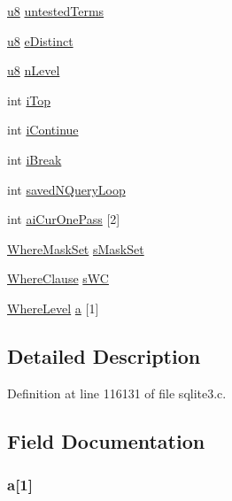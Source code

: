 \begin{DoxyCompactItemize}
\item 
\hyperlink{sqlite3_8c_a74a0f6424ae628af25f23f0a35f6ead3}{u8} \hyperlink{struct_where_info_a0a31d549c31640dcaeb02d9acb20d720}{untested\+Terms}
\item 
\hyperlink{sqlite3_8c_a74a0f6424ae628af25f23f0a35f6ead3}{u8} \hyperlink{struct_where_info_afe5ecc400155291a3822ea56569b83e3}{e\+Distinct}
\item 
\hyperlink{sqlite3_8c_a74a0f6424ae628af25f23f0a35f6ead3}{u8} \hyperlink{struct_where_info_af57795809290e8e1bcebffb5a5cd0787}{n\+Level}
\item 
int \hyperlink{struct_where_info_afd3ca9af6c497b1ae41a842e149cba2a}{i\+Top}
\item 
int \hyperlink{struct_where_info_ae3bb72cb12d44e96b691c6c71dbf1267}{i\+Continue}
\item 
int \hyperlink{struct_where_info_a7f3109c33d52f125acf777d385290bc2}{i\+Break}
\item 
int \hyperlink{struct_where_info_af689a27f89f0be772017cb104cde4636}{saved\+N\+Query\+Loop}
\item 
int \hyperlink{struct_where_info_af78e25c217cb5a4e878c8abcf26cbf74}{ai\+Cur\+One\+Pass} \mbox{[}2\mbox{]}
\item 
\hyperlink{struct_where_mask_set}{Where\+Mask\+Set} \hyperlink{struct_where_info_aec482a9955c074b06f8e4281b8d81ebf}{s\+Mask\+Set}
\item 
\hyperlink{struct_where_clause}{Where\+Clause} \hyperlink{struct_where_info_a85a61ee9b696a7a1630f28ba2801f432}{s\+W\+C}
\item 
\hyperlink{struct_where_level}{Where\+Level} \hyperlink{struct_where_info_a502d0a7b324b3ecc1ce7459390851418}{a} \mbox{[}1\mbox{]}
\end{DoxyCompactItemize}


\subsection{Detailed Description}


Definition at line 116131 of file sqlite3.\+c.



\subsection{Field Documentation}
\hypertarget{struct_where_info_a502d0a7b324b3ecc1ce7459390851418}{}
\subsubsection[{a}]{ a\mbox{[}1\mbox{]}}\label{struct_where_info_a502d0a7b324b3ecc1ce7459390851418}


